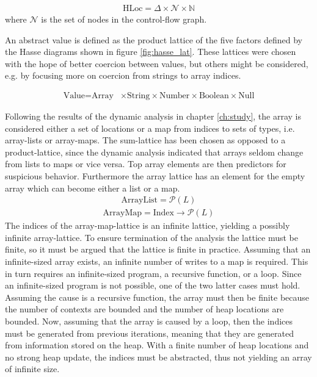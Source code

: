 \begin{align}
\text{HLoc}  = \Delta \times \mathcal{N} \times \mathbb{N}
\end{align}
where $\mathcal{N}$ is the set of nodes in the control-flow graph. 

An abstract value is defined as the product lattice of the five factors defined by the Hasse diagrams shown in figure \ref{fig:hasse_lat}. These lattices were chosen with the hope of better coercion between values, but others might be considered, e.g. by focusing more on coercion from strings to array indices.

\begin{align}
\text{Value} = \text{Array} & \times \text{String} \times \text{Number} \times \text{Boolean}  \times \text{Null}
\end{align}

Following the results of the dynamic analysis in chapter \ref{ch:study}, the array is considered either a set of locations or a map from indices to sets of types, i.e. array-lists or array-maps. The sum-lattice has been chosen as opposed to a product-lattice, since the dynamic analysis indicated that arrays seldom change from lists to maps or vice versa. Top array elements are then predictors for suspicious behavior. Furthermore the array lattice has an element for the empty array which can become either a list or a map.  
\begin{align}
\text{ArrayList}= \mathcal{P}( L )
\end{align}
\begin{align}
\text{ArrayMap}=\text{Index} \rightarrow \mathcal{P}( L )
\end{align}
The indices of the array-map-lattice is an infinite lattice, yielding a possibly infinite array-lattice. To ensure termination of the analysis the lattice must be finite, so it must be argued that the lattice is finite in practice. Assuming that an infinite-sized array exists, an infinite number of writes to a map is required. This in turn requires an infinite-sized program, a recursive function, or a loop. Since an infinite-sized program is not possible, one of the two latter cases must hold. Assuming the cause is a recursive function, the array must then be finite because the number of contexts are bounded and the number of heap locations are bounded. Now, assuming that the array is caused by a loop, then the indices must be generated from previous iterations, meaning that they are generated from information stored on the heap. With a finite number of heap locations and no strong heap update, the indices must be abstracted, thus not yielding an array of infinite size.

